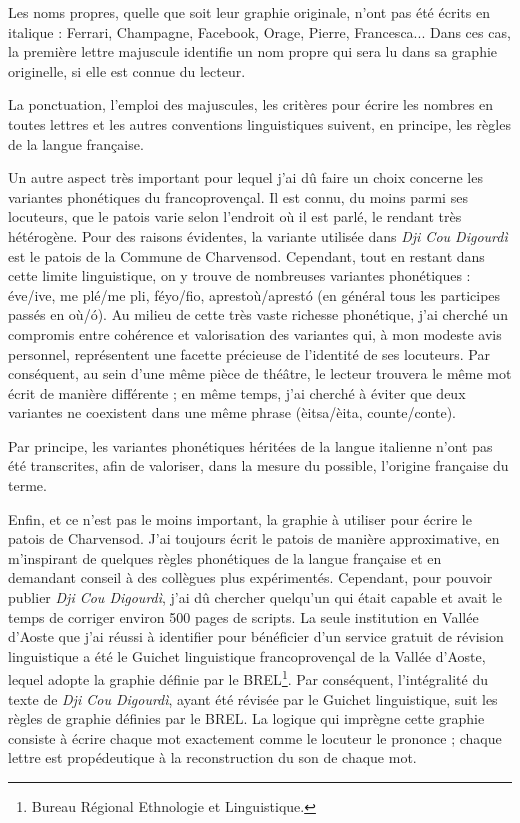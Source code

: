 Les noms propres, quelle que soit leur graphie originale, n'ont pas été écrits en italique : Ferrari, Champagne, Facebook, Orage, Pierre, Francesca... Dans ces cas, la première lettre majuscule identifie un nom propre qui sera lu dans sa graphie originelle, si elle est connue du lecteur.

La ponctuation, l'emploi des majuscules, les critères pour écrire les nombres en toutes lettres et les autres conventions linguistiques suivent, en principe, les règles de la langue française.

Un autre aspect très important pour lequel j'ai dû faire un choix concerne les variantes phonétiques du francoprovençal. Il est connu, du moins parmi ses locuteurs, que le patois varie selon l'endroit où il est parlé, le rendant très hétérogène. Pour des raisons évidentes, la variante utilisée dans \textit{Dji Cou Digourdì} est le patois de la Commune de Charvensod. Cependant, tout en restant dans cette limite linguistique, on y trouve de nombreuses variantes phonétiques : éve/ive, me plé/me pli, féyo/fio, aprestoù/aprestó (en général tous les participes passés en où/ó). Au milieu de cette très vaste richesse phonétique, j'ai cherché un compromis entre cohérence et valorisation des variantes qui, à mon modeste avis personnel, représentent une facette précieuse de l'identité de ses locuteurs. Par conséquent, au sein d'une même pièce de théâtre, le lecteur trouvera le même mot écrit de manière différente ; en même temps, j'ai cherché à éviter que deux variantes ne coexistent dans une même phrase (èitsa/èita, counte/conte).

Par principe, les variantes phonétiques héritées de la langue italienne n'ont pas été transcrites, afin de valoriser, dans la mesure du possible, l'origine française du terme.

Enfin, et ce n'est pas le moins important, la graphie à utiliser pour écrire le patois de Charvensod. J'ai toujours écrit le patois de manière approximative, en m'inspirant de quelques règles phonétiques de la langue française et en demandant conseil à des collègues plus expérimentés. Cependant, pour pouvoir publier \textit{Dji Cou Digourdì}, j'ai dû chercher quelqu'un qui était capable et avait le temps de corriger environ 500 pages de scripts. La seule institution en Vallée d'Aoste que j'ai réussi à identifier pour bénéficier d'un service gratuit de révision linguistique a été le Guichet linguistique francoprovençal de la Vallée d'Aoste, lequel adopte la graphie définie par le BREL\footnote{ Bureau Régional Ethnologie et Linguistique.}. Par conséquent, l'intégralité du texte de \textit{Dji Cou Digourdì}, ayant été révisée par le Guichet linguistique, suit les règles de graphie définies par le BREL. La logique qui imprègne cette graphie consiste à écrire chaque mot exactement comme le locuteur le prononce ; chaque lettre est propédeutique à la reconstruction du son de chaque mot.

